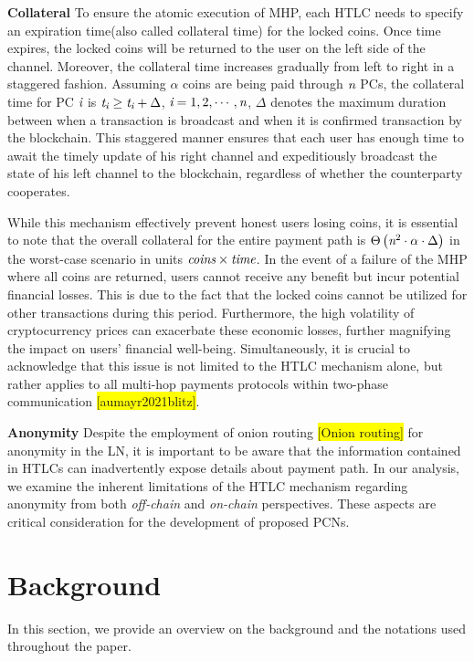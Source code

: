 \documentclass[conference]{IEEEtran}
\begin{document}
\textbf{Collateral} To ensure the atomic execution of MHP, each HTLC needs to specify an expiration time(also called collateral time) for the locked coins. Once time expires, the locked coins will be returned to the user on the left side of the channel. Moreover, the collateral time increases gradually
from left to right in a staggered fashion. Assuming $\alpha$ coins are being paid through $\emph{n}$ PCs, the collateral time for PC $\emph{i}$ is $\emph{t}_{\emph{i}}\geq\emph{t}_{\emph{i}}+\Delta$, $\emph{i}=1,2,\cdots ,\emph{n}$, $\Delta$ denotes the maximum duration between when a transaction is broadcast and when it is confirmed transaction by the blockchain. This staggered manner
ensures that each user has enough time to await the timely update of his right channel and expeditiously broadcast the state of his left channel to the blockchain, regardless of whether the counterparty cooperates. 

While this mechanism effectively prevent honest users losing coins, it is essential to note that the overall collateral for the entire payment path 
is $\Theta \left ( \emph{n}^{2}\cdot \alpha\cdot  \Delta  \right )$ in the worst-case scenario in units $ \emph{coins}\times \emph{time}$. In the event of a failure of the MHP where all coins are returned, users cannot receive any benefit but incur potential financial losses. This is due to the fact that the locked coins cannot be utilized for other transactions during this period. Furthermore, the high 
volatility of cryptocurrency prices can exacerbate these economic losses, further magnifying the impact on users' financial well-being. Simultaneously, it is crucial to acknowledge that this issue is not limited to the HTLC mechanism alone, but rather applies to all multi-hop payments protocols within two-phase communication \colorbox{yellow}{[aumayr2021blitz]}. 

\textbf{Anonymity} Despite the employment of onion routing \colorbox{yellow}{[Onion routing]} for anonymity in the LN, it is important to be aware that the information contained in HTLCs can inadvertently expose details about payment path. In our analysis, we examine the inherent limitations of the HTLC mechanism regarding anonymity from both \textit{off-chain} and \textit{on-chain} perspectives. These aspects are critical consideration for the development of proposed PCNs.

\section{Background}
In this section, we provide an overview on the background and the notations used throughout the paper.
\end{document}
